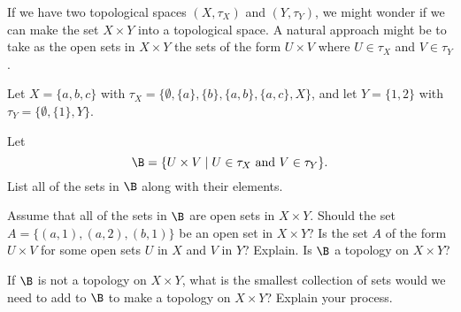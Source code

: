 \label{chap:Product_topology}


\vspace*{-17 pt}
\framebox{
\parbox{\dimexpr\linewidth-3\fboxsep-3\fboxrule}
{\begin{fqs}
\item 

\end{fqs}}}%

\vspace*{13 pt}

\label{sec_prod_top_intro}
If we have two topological spaces $(X, \tau_X)$ and $(Y , \tau_Y)$, we might wonder if we can make the set $X \times Y$ into a topological space. A natural approach might be to take as the open sets in $X \times Y$ the sets of the form $U \times V$ where $U \in \tau_X$  and $V \in \tau_Y$. 

\begin{pa} \label{PA:pd_top_1} Let $X = \{a,b,c\}$ with $\tau_X = \{\emptyset, \{a\}, \{b\}, \{a,b\}, \{a,c\}, X\}$, and let $Y = \{1,2\}$ with $\tau_Y = \{\emptyset, \{1\}, Y\}$. 
\be
\item Let 
\begin{equation} \label{eq:prod_basis}
\B = \{U \times V \mid U \in \tau_X \text{ and } V \in \tau_Y\}.
\end{equation}
List all of the sets in $\B$ along with their elements. 
 
\item Assume that all of the sets in $\B$ are open sets in $X \times Y$. Should the set $A = \{(a,1), (a,2), (b,1)\}$ be an open set in $X \times Y$? Is the set $A$ of the form $U \times V$ for some open sets $U$ in $X$ and $V$ in $Y$? Explain. Is $\B$ a topology on $X \times Y$? 

\item If $\B$ is not a topology on $X \times Y$, what is the smallest collection of sets would we need to add to $\B$ to make a topology on $X \times Y$? Explain your process. 

\ee

\end{pa}

